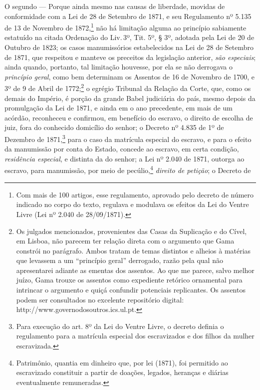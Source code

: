 O segundo --- Porque ainda mesmo nas causas de liberdade, movidas de
conformidade com a Lei de 28 de Setembro de 1871, e seu Regulamento nº
5.135 de 13 de Novembro de 1872,\footnote{Com mais de 100 artigos, esse
  regulamento, aprovado pelo decreto de número indicado no corpo do
  texto, regulava e modulava os efeitos da Lei do Ventre Livre (Lei nº
  2.040 de 28/09/1871).} não há limitação alguma ao princípio
sabiamente estatuído na citada Ordenação do Liv.\,3º, Tit. 5º, § 3º,
adotada pela Lei de 20 de Outubro de 1823; os casos manumissórios
estabelecidos na Lei de 28 de Setembro de 1871, que respeitou e manteve
os preceitos da legislação anterior, \emph{são especiais}; ainda quando,
portanto, tal limitação houvesse, por ela se não derrogava o
\emph{princípio geral}, como bem determinam os Assentos de 16 de
Novembro de 1700, e 3º de 9 de Abril de 1772;\footnote{Os julgados
  mencionados, provenientes das Casas da Suplicação e do Cível, em
  Lisboa, não parecem ter relação direta com o argumento que Gama
  constrói no parágrafo. Ambos tratam de temas distintos e alheios à
  matérias que levassem a um ``princípio geral'' derrogado, razão pela qual
  não apresentarei adiante as ementas dos assentos. Ao que me parece,
  salvo melhor juízo, Gama trouxe os assentos como expediente retórico
  ornamental para intrincar o argumento e quiçá confundir potenciais
  replicantes. Os assentos podem ser consultados no excelente
  repositório digital: http://www.governodosoutros.ics.ul.pt.} o
egrégio Tribunal da Relação da Corte, que, como os demais do Império, é
porção da grande Babel judiciária do país, mesmo depois da promulgação
da Lei de 1871, e ainda em o ano precedente, em mais de um acórdão,
reconheceu e confirmou, em benefício do escravo, o direito de escolha de
juiz, fora do conhecido domicílio do senhor; o Decreto nº 4.835 de 1º de
Dezembro de 1871,\footnote{Para execução do art. 8º da Lei do Ventre
  Livre, o decreto definia o regulamento para a matrícula especial dos
  escravizados e dos filhos da mulher escravizada.} para o caso da
matrícula especial do escravo, e para o efeito da manumissão por conta
do Estado, concede ao escravo, em certa condição, \emph{residência
especial}, e distinta da do senhor; a Lei nº 2.040 de 1871, outorga ao
escravo, para manumissão, por meio de pecúlio,\footnote{Patrimônio,
  quantia em dinheiro que, por lei (1871), foi permitido ao escravizado
  constituir a partir de doações, legados, heranças e diárias
  eventualmente remuneradas.} \emph{direito de petição}; o Decreto de

